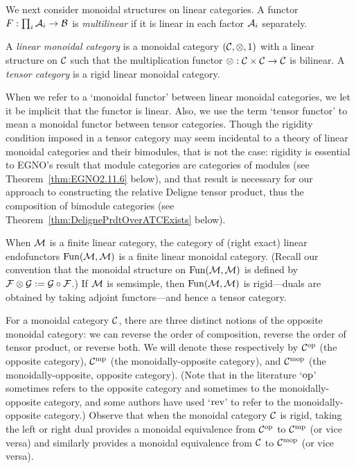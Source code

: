 \documentclass{amsart}
\begin{document}

We next consider monoidal structures on linear categories.  A functor $F: \prod_i \mathcal A_i \to \mathcal B$ is \emph{multilinear} if it is linear in each factor $\mathcal A_i$ separately.

\begin{definition}
A \emph{linear monoidal category} is a monoidal category $(\mathcal C, \otimes, 1)$ with a linear structure on $\mathcal C$ such that the multiplication functor $\otimes: \mathcal C \times \mathcal C \rightarrow \mathcal C$ is bilinear.  A \emph{tensor category} is a rigid linear monoidal category.
\end{definition}
\nid When we refer to a `monoidal functor' between linear monoidal categories, we let it be implicit that the functor is linear.  Also, we use the term `tensor functor' to mean a monoidal functor between tensor categories.  Though the rigidity condition imposed in a tensor category may seem incidental to a theory of linear monoidal categories and their bimodules, that is not the case: rigidity is essential to EGNO's result that module categories are categories of modules (see Theorem~\ref{thm:EGNO2.11.6} below), and that result is necessary for our approach to constructing the relative Deligne tensor product, thus the composition of bimodule categories (see Theorem~\ref{thm:DelignePrdtOverATCExists} below).

\begin{example}
When $\mathcal M$ is a finite linear category, the category of (right exact) linear endofunctors $\operatorname{Fun}(\mathcal M,\mathcal M)$ is a finite linear monoidal category.  (Recall our convention that the monoidal structure on $\operatorname{Fun}(\mathcal M,\mathcal M)$ is defined by $\mathcal F \otimes \mathcal G := \mathcal G \circ \mathcal F$.)  If $\mathcal M$ is semsimple, then $\operatorname{Fun}(\mathcal M,\mathcal M)$ is rigid---duals are obtained by taking adjoint functors---and hence a tensor category.
\end{example} %

For a monoidal category $\mathcal C$, there are three distinct notions of the opposite monoidal category: we can reverse the order of composition, reverse the order of tensor product, or reverse both.  We will denote these respectively by $\mathcal C^{\mathrm{op}}$ (the opposite category), $\mathcal C^{\mathrm{mp}}$ (the monoidally-opposite category), and $\mathcal C^{\mathrm{mop}}$ (the monoidally-opposite, opposite category).  (Note that in the literature `$\mathrm{op}$' sometimes refers to the opposite category and sometimes to the monoidally-opposite category, and some authors have used `$\mathrm{rev}$' to refer to the monoidally-opposite category.)  Observe that when the monoidal category $\mathcal C$ is rigid, taking the left or right dual provides a monoidal equivalence from $\mathcal C^{\mathrm{op}}$ to $\mathcal C^{\mathrm{mp}}$ (or vice versa) and similarly provides a monoidal equivalence from $\mathcal C$ to $\mathcal C^{\mathrm{mop}}$ (or vice versa).
\end{document}
